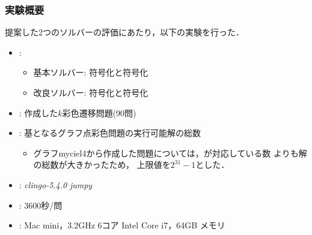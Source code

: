 \documentclass[dvipdfmx,11pt]{beamer}
\begin{document}

\begin{frame}\frametitle{実験概要}
  提案した2つのソルバーの評価にあたり，以下の実験を行った．
  \bigskip
  \begin{itemize}
    \item {}: 
          \begin{itemize}
            \item 基本ソルバー: 符号化と符号化
            \item 改良ソルバー: 符号化と符号化
          \end{itemize}
    \item {}: 作成した$k$彩色遷移問題(90問)
    \item {}: 基となるグラフ点彩色問題の実行可能解の総数
          \begin{itemize}
            \item グラフmyciel4から作成した問題については，{\clingo}が対応している数
                  よりも解の総数が大きかったため，
                  上限値を$2^{31}-1$とした．
          \end{itemize}
    \item {}: \textit{clingo-5.4.0} \textit{jumpy}
    \item {}: 3600秒/問
    \item {}: Mac mini，3.2GHz 6コア Intel Core i7，64GB メモリ
  \end{itemize}
  
\end{frame}
\end{document}
